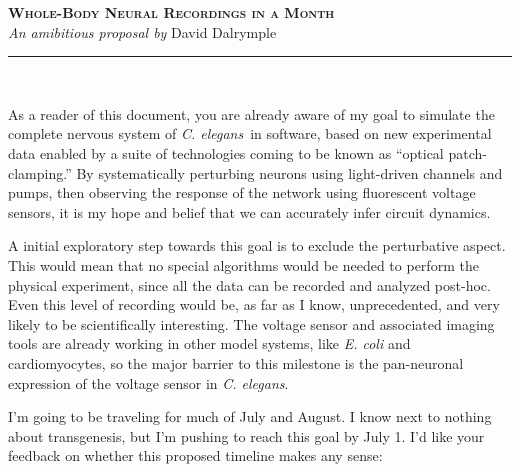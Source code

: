 \documentclass[letter,11pt]{article}
\newcommand{\cel}{{\em C. elegans}}
\begin{document}
\begin{center}
	\textsc{\LARGE {\bfseries Whole-Body Neural Recordings in a Month}}\\[2mm]
  \textit{An amibitious proposal by}  \textrm{David Dalrymple}\\[1mm]
	\rule[2mm]{0.66\textwidth}{0.25mm}\\[4mm]
\end{center}

\thispagestyle{empty}

As a reader of this document, you are already aware of my goal to simulate the
complete nervous system of \cel\ in software, based on new experimental data
enabled by a suite of technologies coming to be known as ``optical patch-clamping.''
By systematically perturbing neurons using light-driven channels and pumps,
then observing the response of the network using fluorescent voltage sensors,
it is my hope and belief that we can accurately infer circuit dynamics.

A initial exploratory step towards this goal is to exclude the perturbative
aspect. This would mean that no special algorithms would be needed to perform
the physical experiment, since all the data can be recorded and analyzed
post-hoc. Even this level of recording would be, as far as I know,
unprecedented, and very likely to be scientifically interesting. The voltage
sensor and associated imaging tools are already working in other model systems,
like {\em E. coli} and cardiomyocytes, so the major barrier to this milestone
is the pan-neuronal expression of the voltage sensor in \cel.

I'm going to be traveling for much of July and August. I know next to nothing
about transgenesis, but I'm pushing to reach this goal by July 1. I'd like your
feedback on whether this proposed timeline makes any sense:
\end{document}
